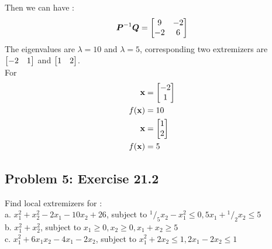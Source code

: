 \documentclass{article}
\newcommand*\rfrac[2]{{}^{#1}\!/_{#2}}
\begin{document}
Then we can have : \\ 
\begin{align*} 
\boldsymbol{P}^{-1}\boldsymbol{Q} = \begin{bmatrix} 9 & -2 \\ -2 & 6  \end{bmatrix} \\
\end{align*} 
The eigenvalues are $\lambda = 10 $ and $\lambda = 5$, corresponding two extremizers are $\begin{bmatrix} -2 & 1 \end{bmatrix} $ and $\begin{bmatrix} 1 & 2  \end{bmatrix} $. \\
For \begin{align*} 
\boldsymbol{\mathrm{x}} &= \begin{bmatrix} -2 \\ 1 \end{bmatrix} \\
f(\boldsymbol{\mathrm{x}} )& = 10  \\
\boldsymbol{\mathrm{x}} &= \begin{bmatrix} 1 \\ 2 \end{bmatrix} \\
f(\boldsymbol{\mathrm{x}} )& = 5  \\
\end{align*}


\hypertarget{}{}
\subsection*{{Problem 5: Exercise 21.2}}
\label{}
Find local extremizers for : \\
a. $x_1^2 + x_2^2 -2x_1 - 10x_2 + 26 $,  subject to $\rfrac{1}{5} x_2 -x_1^2 \leq 0, 5x_1+\rfrac{1}{2}x_2\leq5$ \\
b. $x_1^2 +x_2^2 $, subject to $x_1 \geq0, x_2\geq0, x_1+x_2\geq 5$ \\
c. $x_1^2 +6x_1x_2 -4x_1 -2x_2 $,  subject to $x_1^2 +2x_2\leq1, 2x_1-2x_2 \leq 1$ 
\end{document}
